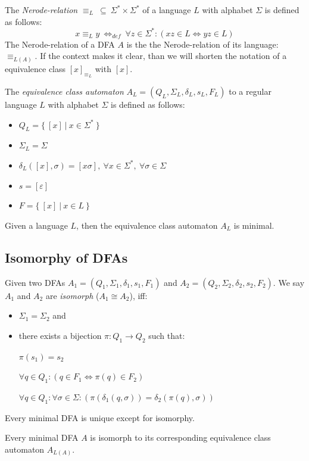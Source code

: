 The \emph{Nerode-relation} $\equiv_L\ \subseteq\ \Sigma^* \times \Sigma^*$ of a language $L$ with alphabet $\Sigma$ is defined as follows:
\begin{displaymath}
	x \equiv_L y\ \Leftrightarrow_{def}\ \forall z\in\Sigma^*\colon (xz\in L \Leftrightarrow yz\in L)
\end{displaymath}
The Nerode-relation of a DFA $A$ is the the Nerode-relation of its language: $\equiv_{L(A)}$. If the context makes it clear, than we will shorten the notation of a equivalence class $[x]_{\equiv_L}$ with $[x]$.

The \emph{equivalence class automaton} $A_L = (Q_L, \Sigma_L, \delta_L, s_L, F_L)$ to a regular language $L$ with alphabet $\Sigma$ is defined as follows:
\begin{itemize}
	\item $Q_L = \{\ [x]\ |\ x \in \Sigma^*\ \}$
	\item $\Sigma_L = \Sigma$
	\item $\delta_L([x], \sigma) = [x\sigma],\ \forall x\in\Sigma^*,\ \forall\sigma\in\Sigma$
	\item $s = [\varepsilon]$
	\item $F = \{\ [x]\ |\ x \in L\ \}$
\end{itemize}
\begin{theorem}
	Given a language $L$, then the equivalence class automaton $A_L$ is minimal.
\end{theorem}

\subsection{Isomorphy of DFAs}

Given two DFAs $A_1 = (Q_1, \Sigma_1, \delta_1, s_1, F_1)$ and $A_2 = (Q_2, \Sigma_2, \delta_2, s_2, F_2)$. We say $A_1$ and $A_2$ are \emph{isomorph} ($A_1 \cong A_2$), iff:
\begin{itemize}
	\item $\Sigma_1 = \Sigma_2$ and
	\item there exists a bijection $\pi\colon Q_1 \to Q_2$ such that:
	
	$\pi(s_1) = s_2$
	
	$\forall q\in Q_1\colon (q\in F_1 \Longleftrightarrow \pi(q)\in F_2)$
	
	$\forall q\in Q_1\colon \forall\sigma\in\Sigma\colon (\pi(\delta_1(q,\sigma))=\delta_2(\pi(q),\sigma))$
\end{itemize}
\begin{theorem} \textnormal{\cite[p. 45]{schoening01}} 
	Every minimal DFA is unique except for isomorphy.
\end{theorem}
\begin{corollary}\label{ch:1:cor:all-min-dfa-ism}
	Every minimal DFA $A$ is isomorph to its corresponding equivalence class automaton $A_{L(A)}$.
\end{corollary}

